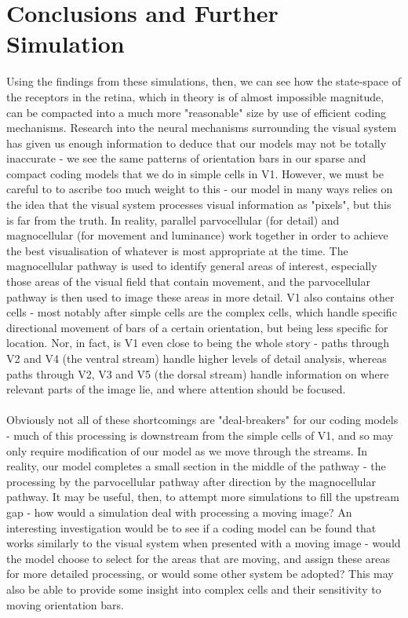\documentclass[12pt]{article}
\begin{document}
\section{Conclusions and Further Simulation}
Using the findings from these simulations, then, we can see how the state-space of the receptors in the retina, which in theory is of almost impossible magnitude, can be compacted into a much more "reasonable" size by use of efficient coding mechanisms. Research into the neural mechanisms surrounding the visual system has given us enough information to deduce that our models may not be totally inaccurate - we see the same patterns of orientation bars in our sparse and compact coding models that we do in simple cells in V1. However, we must be careful to to ascribe too much weight to this - our model in many ways relies on the idea that the visual system processes visual information as "pixels", but this is far from the truth. In reality, parallel parvocellular (for detail) and magnocellular (for movement and luminance) work together in order to achieve the best visualisation of whatever is most appropriate at the time. The magnocellular pathway is used to identify general areas of interest, especially those areas of the visual field that contain movement, and the parvocellular pathway is then used to image these areas in more detail. V1 also contains other cells - most notably after simple cells are the complex cells, which handle specific directional movement of bars of a certain orientation, but being less specific for location. Nor, in fact, is V1 even close to being the whole story - paths through V2 and V4 (the ventral stream) handle higher levels of detail analysis, whereas paths through V2, V3 and V5 (the dorsal stream) handle information on where relevant parts of the image lie, and where attention should be focused.\\\hfill\\
Obviously not all of these shortcomings are "deal-breakers" for our coding models - much of this processing is downstream from the simple cells of V1, and so may only require modification of our model as we move through the streams. In reality, our model completes a small section in the middle of the pathway - the processing by the parvocellular pathway after direction by the magnocellular pathway. It may be useful, then, to attempt more simulations to fill the upstream gap - how would a simulation deal with processing a moving image? An interesting investigation would be to see if a coding model can be found that works similarly to the visual system when presented with a moving image - would the model choose to select for the areas that are moving, and assign these areas for more detailed processing, or would some other system be adopted? This may also be able to provide some insight into complex cells and their sensitivity to moving orientation bars.\\\hfill\\
\end{document}
